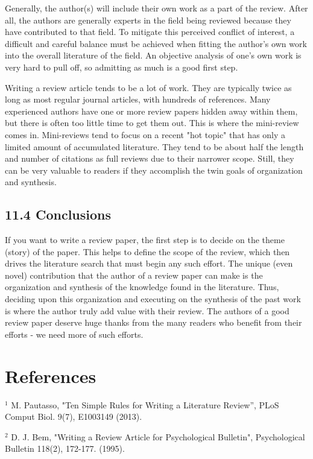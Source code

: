 Generally, the author(s) will include their own work as a part of the review. After all, the authors are generally experts in the field being reviewed because they have contributed to that field. To mitigate this perceived conflict of interest, a difficult and careful balance must be achieved when fitting the author's own work into the overall literature of the field. An objective analysis of one's own work is very hard to pull off, so admitting as much is a good first step.

Writing a review article tends to be a lot of work. They are typically twice as long as most regular journal articles, with hundreds of references. Many experienced authors have one or more review papers hidden away within them, but there is often too little time to get them out. This is where the mini-review comes in. Mini-reviews tend to focus on a recent "hot topic" that has only a limited amount of accumulated literature. They tend to be about half the length and number of citations as full reviews due to their narrower scope. Still, they can be very valuable to readers if they accomplish the twin goals of organization and synthesis.

\subsection*{11.4 Conclusions}
If you want to write a review paper, the first step is to decide on the theme (story) of the paper. This helps to define the scope of the review, which then drives the literature search that must begin any such effort. The unique (even novel) contribution that the author of a review paper can make is the organization and synthesis of the knowledge found in the literature. Thus, deciding upon this organization and executing on the synthesis of the past work is where the author truly add value with their review. The authors of a good review paper deserve huge thanks from the many readers who benefit from their efforts - we need more of such efforts.

\section*{References}
${ }^{1}$ M. Pautasso, "Ten Simple Rules for Writing a Literature Review”, PLoS Comput Biol. 9(7), E1003149 (2013).

${ }^{2}$ D. J. Bem, "Writing a Review Article for Psychological Bulletin", Psychological Bulletin 118(2), 172-177. (1995).

